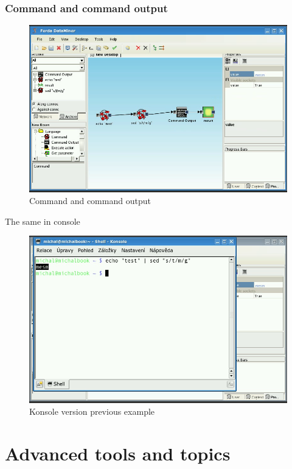 \documentclass[a4paper,12pt]{book}
\begin{document}
\subsubsection{Command and command output}
\begin{figure}
	\includegraphics[width=13.72cm]{command2.png}
	\caption{Command and command output}
\end{figure}

The same in console
\begin{figure}
	\includegraphics[width=13.72cm]{command3.png}
	\caption{Konsole version previous example}
\end{figure}

\section{Advanced tools and topics}
\end{document}
